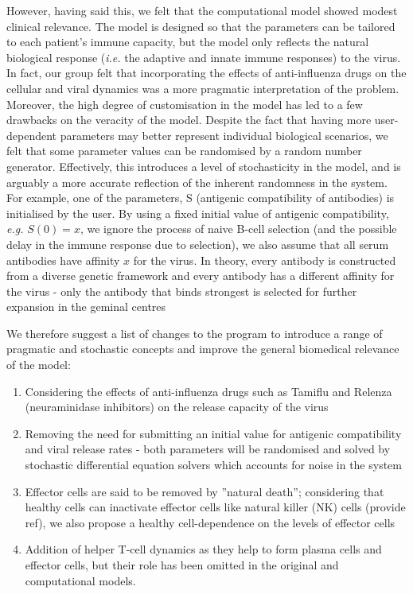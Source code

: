 \documentclass[a4paper, 12pt]{report}
\begin{document}

However, having said this, we felt that the computational model showed modest clinical relevance. The model is designed so that the parameters can be tailored to each patient's immune capacity, but the model only reflects the natural biological response (\textit{i.e.} the adaptive and innate immune responses) to the virus. In fact, our group felt that incorporating the effects of anti-influenza drugs on the cellular and viral dynamics was a more pragmatic interpretation of the problem. \\

Moreover, the high degree of customisation in the model has led to a few drawbacks on the veracity of the model. Despite the fact that having more user-dependent parameters may better represent individual biological scenarios, we felt that some parameter values can be randomised by a random number generator. Effectively, this introduces a level of stochasticity in the model, and is arguably a more accurate reflection of the inherent randomness in the system. \\

For example, one of the parameters, S (antigenic compatibility of antibodies) is initialised by the user. By using a fixed initial value of antigenic compatibility, \textit{e.g.} $S(0) = x$, we ignore the process of naive B-cell selection (and the possible delay in the immune response due to selection), we also assume that all serum antibodies have affinity $x$ for the virus. In theory, every antibody is constructed from a diverse genetic framework and every antibody has a different affinity for the virus - only the antibody that binds strongest is selected for further expansion in the geminal centres %

We therefore suggest a list of changes to the program to introduce a range of pragmatic and stochastic concepts and improve the general biomedical relevance of the model:
\begin{enumerate}
\item Considering the effects of anti-influenza drugs such as Tamiflu and Relenza (neuraminidase inhibitors) on the release capacity of the virus
\item Removing the need for submitting an initial value for antigenic compatibility and viral release rates - both parameters will be randomised and solved by stochastic differential equation solvers which accounts for noise in the system
\item Effector cells are said to be removed by ''natural death''; considering that healthy cells can inactivate effector cells like natural killer (NK) cells (provide ref), we also propose a healthy cell-dependence on the levels of effector cells
\item Addition of helper T-cell dynamics as they help to form plasma cells and effector cells, but their role has been omitted in the original and computational models.
\end{enumerate}
\end{document}
